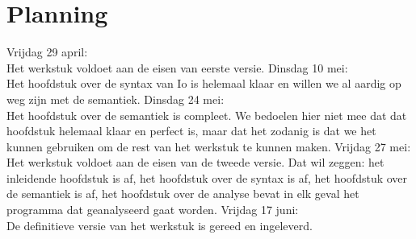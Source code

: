 \documentclass[12pt]{article}
\begin{document}
\section{Planning}
Vrijdag 29 april: \\Het werkstuk voldoet aan de eisen van eerste versie.\newline\newline %
Dinsdag 10 mei: \\Het hoofdstuk over de syntax van Io is helemaal klaar en willen we al aardig op weg zijn met de semantiek.\newline\newline
Dinsdag 24 mei: \\Het hoofdstuk over de semantiek is compleet. We bedoelen hier niet mee dat dat hoofdstuk helemaal klaar en perfect is, maar
dat het zodanig is dat we het kunnen gebruiken om de rest van het werkstuk te kunnen maken.\newline\newline
Vrijdag 27 mei: \\Het werkstuk voldoet aan de eisen van de tweede versie. Dat wil zeggen: het inleidende hoofdstuk is af, het hoofdstuk over de syntax is af, het hoofdstuk over de semantiek is af, het hoofdstuk over de analyse bevat in elk geval het programma dat geanalyseerd gaat worden.\newline\newline
Vrijdag 17 juni: \\De definitieve versie van het werkstuk is gereed en ingeleverd.
\end{document}
